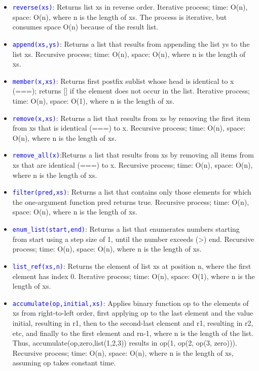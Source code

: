 \documentclass[10pt,portrait,a4paper]{article}
\newcommand\codeblue[1]{\textcolor{blue}{\code{#1}}}
\def\code#1{\texttt{#1}}
\begin{document}
\begin{multicols*}{4}
\begin{itemize}
    \item \codeblue{reverse(xs)}: Returns list xs in reverse order. Iterative process; time: O(n), space: O(n), where n is the length of xs. The process is iterative, but consumes space O(n) because of the result list.
    \item \codeblue{append(xs,ys)}: Returns a list that results from appending the list ys to the list xs. Recursive process; time: O(n), space: O(n), where n is the length of xs.
    \item \codeblue{member(x,xs)}: Returns first postfix sublist whose head is identical to x (===); returns [] if the element does not occur in the list. Iterative process; time: O(n), space: O(1), where n is the length of xs.
    \item \codeblue{remove(x,xs)}: Returns a list that results from xs by removing the first item from xs that is identical (===) to x. Recursive process; time: O(n), space: O(n), where n is the length of xs.
    \item \codeblue{remove\_all(x)}:Returns a list that results from xs by removing all items from xs that are identical (===) to x. Recursive process; time: O(n), space: O(n), where n is the length of xs.
    \item \codeblue{filter(pred,xs)}: Returns a list that contains only those elements for which the one-argument function pred returns true. Recursive process; time: O(n), space: O(n), where n
          is the length of xs.
    \item \codeblue{enum\_list(start,end)}: Returns a list that enumerates numbers starting from start using a step size of 1, until the number exceeds (>) end. Recursive process; time: O(n), space: O(n), where n is the length of xs.
    \item \codeblue{list\_ref(xs,n)}: Returns the element of list xs at position n, where the first element has index 0. Iterative process; time: O(n), space: O(1), where n is the length of xs.
    \item \codeblue{accumulate(op,initial,xs)}: Applies binary function op to the elements of xs from right-to-left order, first applying op to the last element and the value initial, resulting in r1, then to the second-last element and r1, resulting in r2, etc, and finally to the first element and rn-1, where n is the length of the list. Thus, accumulate(op,zero,list(1,2,3)) results in op(1, op(2, op(3, zero))). Recursive process; time: O(n), space: O(n), where n is the length of xs, assuming op takes constant time.
  \end{itemize}

\end{multicols*}
\end{document}
